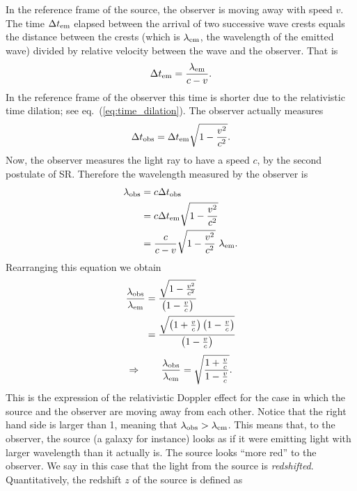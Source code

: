 In the reference frame of the source, the observer is moving away with speed $v$. The time $\Delta t_{\rm em}$ elapsed between the arrival of two successive wave crests equals the distance between the crests (which is $\lambda_{\rm em}$, the wavelength of the emitted wave) divided by relative velocity between the wave and the observer. That is
\begin{equation}
\Delta t_{\rm em}=\frac{\lambda_{\rm em}}{c-v}.
\end{equation}
In the reference frame of the observer this time is shorter due to the relativistic time dilation; see eq.\ (\ref{eq:time_dilation}). The observer actually measures
\begin{equation}
\Delta t_{\rm obs}=\Delta t_{\rm em}\sqrt{1-\frac{v^2}{c^2}}.
\end{equation}
Now, the observer measures the light ray to have a speed $c$, by the second postulate of SR. Therefore the wavelength measured by the observer is
\begin{equation}
\begin{split}
\lambda_{\rm obs}&=c\Delta t_{\rm obs}\\
&=c\Delta t_{\rm em}\sqrt{1-\frac{v^2}{c^2}}\\
&=\frac{c}{c-v}\sqrt{1-\frac{v^2}{c^2}}~\lambda_{\rm em}.
\end{split}
\end{equation}
Rearranging this equation we obtain
\begin{equation}
\begin{split}
\frac{\lambda_{\rm obs}}{\lambda_{\rm em}}&=\frac{\sqrt{1-\frac{v^2}{c^2}}}{\left(1-\frac{v}{c}\right)}\\
&=\frac{\sqrt{\left(1+\frac{v}{c}\right)\left(1-\frac{v}{c}\right)}}{\left(1-\frac{v}{c}\right)}\\
\end{split}
\end{equation}
\begin{equation}
\Rightarrow~~~~~~\frac{\lambda_{\rm obs}}{\lambda_{\rm em}}= \sqrt{\frac{1+\frac{v}{c}}{1-\frac{v}{c}}}.
\end{equation}
This is the expression of the relativistic Doppler effect for the case in which the source and the observer are moving away from each other. Notice that the right hand side is larger than 1, meaning that $\lambda_{\rm obs}>\lambda_{\rm em}$. This means that, to the observer, the source (a galaxy for instance) looks as if it were emitting light with larger wavelength than it actually is. The source looks ``more red'' to the observer. We say in this case that the light from the source is {\it redshifted}. Quantitatively, the redshift $z$ of the source is defined as
